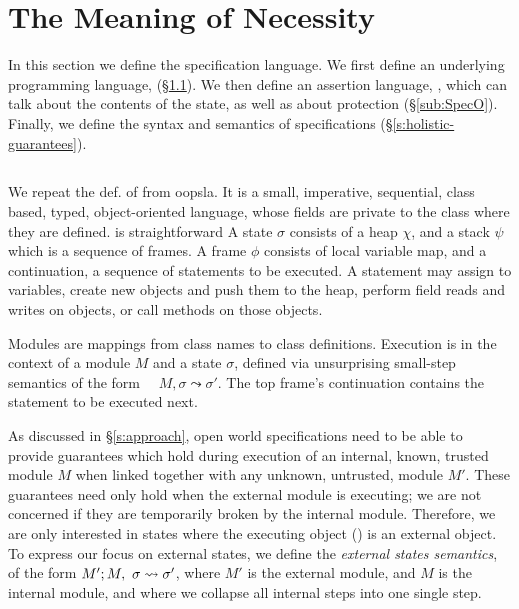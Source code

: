 \section{The Meaning of Necessity}
\label{s:semantics}

 
In this section we define {the}  \Nec specification language.  
We first define an underlying programming language, \Loo (\S \ref{sub:Loo}).
We then define an assertion language, \SpecO, which can talk about the
contents of the state, as well as about protection (\S \ref{sub:SpecO}).  Finally, we define the syntax and
semantics of  \Nec
specifications (\S \ref{s:holistic-guarantees}).


\subsection{\Loo}
\label{sub:Loo} 
We repeat the def. of  \Loo from oopsla. It is a {small}, imperative, sequential, 
class based, typed, object-oriented language, whose
fields are private to the class where they are defined. 
\Loo is straightforward
 A \Loo state $\sigma$ consists of a 
heap $\chi$, and a  {stack $\psi$ which is a sequence of frames}.
A frame $\phi$ consists of
local variable map, and a continuation, \ie a sequence of statements to be executed.
 A statement may assign to variables, create new objects and push them to the heap, 
perform field reads and writes on objects,  or
 call methods on those objects. 

 Modules are mappings
from class names to class definitions. 
Execution 
is in the context of  a module $M$ and   a state $\sigma$,
 defined via unsurprising small-step semantics of the form \ \ 
   $M, \sigma \leadsto \sigma'$.
The   top frame's continuation contains the statement to be %
executed next.
 
As discussed in \S \ref{s:approach}, %
{open world specifications need to be able to provide}
guarantees which hold
during execution of an internal, 
known, trusted module $M$ when linked together with any
unknown, untrusted, module $M'$. These guarantees need only hold 
when the external module is executing; we are not concerned if they are
temporarily broken by the internal module. Therefore, we are only interested in states where the
executing object (\prg{this}) is an external object. 
To express our focus on external states, we define the  \emph{external states semantics}, of the form 
$M' ; M,\ \sigma \leadsto \sigma'$, where $M'$ is the external
module, and $M$ is the internal module, and where we
collapse all internal steps into one single step.

